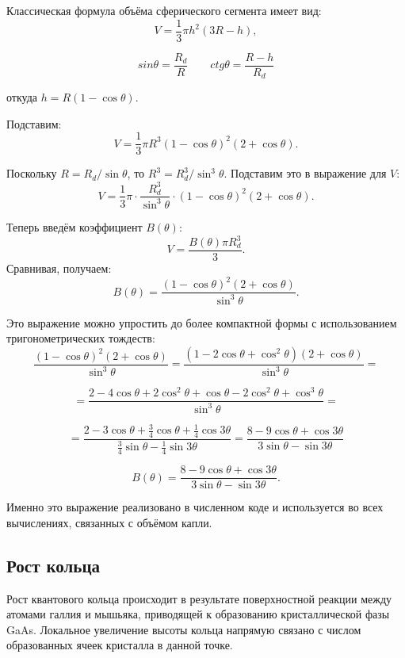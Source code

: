 \documentclass[14pt,oneside]{extarticle}
\begin{document}
Классическая формула объёма сферического сегмента имеет вид:
\begin{equation}
V = \frac{1}{3} \pi h^2 (3R - h),
\end{equation}

\[
sin\theta = \frac{R_d}{R}
\qquad
ctg\theta = \frac{R-h}{R_d}
\]

откуда $h = R(1 - \cos\theta)$.

Подставим:
\[
V = \frac{1}{3} \pi R^3 (1 - \cos\theta)^2 (2 + \cos\theta).
\]

Поскольку $R = R_d / \sin\theta$, то $R^3 = R_d^3 / \sin^3\theta$. Подставим это в выражение для $V$:
\[
V = \frac{1}{3} \pi \cdot \frac{R_d^3}{\sin^3 \theta} \cdot (1 - \cos\theta)^2 (2 + \cos\theta).
\]

Теперь введём коэффициент $B(\theta)$:
\begin{equation}
V = \frac{B(\theta)\pi R_d^3}{3}.
\end{equation}
Сравнивая, получаем:
\[
B(\theta) = \frac{\left(1-\cos\theta\right)^{2}\left(2+\cos\theta\right)}{\sin^{3}\theta}.
\]

Это выражение можно упростить до более компактной формы с использованием тригонометрических тождеств:
\[
\frac{\left(1-\cos\theta\right)^{2}\left(2+\cos\theta\right)}{\sin^{3}\theta}=\frac{\left(1-2\cos\theta+\cos^{2}\theta\right)\left(2+\cos\theta\right)}{\sin^{3}\theta}=
\]

\[
=\frac{2-4\cos\theta+2\cos^{2}\theta+\cos\theta-2\cos^{2}\theta+\cos^{3}\theta}{\sin^{3}\theta}=
\]

\[
=\frac{2-3\cos\theta+\frac{3}{4}\cos\theta+\frac{1}{4}\cos3\theta}{\frac{3}{4}\sin\theta-\frac{1}{4}\sin3\theta}=\frac{8-9\cos\theta+\cos3\theta}{3\sin\theta-\sin3\theta}
\]

\begin{equation}
B(\theta) = \frac{8-9\cos\theta+\cos3\theta}{3\sin\theta-\sin3\theta}
.
\label{eq:Btheta_final}
\end{equation}

Именно это выражение реализовано в численном коде и используется во всех вычислениях, связанных с объёмом капли.

\subsection{Рост кольца}

Рост квантового кольца происходит в результате поверхностной реакции между атомами галлия и мышьяка, приводящей к образованию кристаллической фазы GaAs. Локальное увеличение высоты кольца напрямую связано с числом образованных ячеек кристалла в данной точке.
\end{document}
